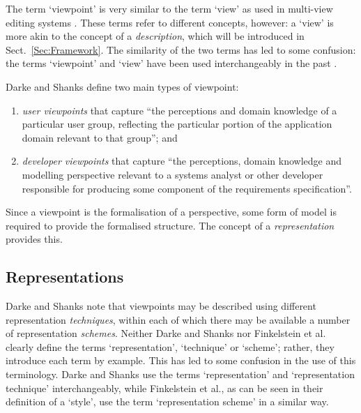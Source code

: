 \documentclass[10pt]{llncs}
\begin{document}
The term `viewpoint' is very similar to the term `view' as used in multi-view editing systems \cite{Grun:JC:1993:PhD,Jaco:DA:1995:MultiView,Meye:S:1991:IEEE}. These terms refer to different concepts, however: a `view' is more akin to the concept of a \emph{description}, which will be introduced in Sect.~\ref{Sec:Framework}. The similarity of the two terms has led to some confusion: the terms `viewpoint' and `view' have been used interchangeably in the past \cite{Jaco:DA:1995:MultiView}.

Darke and Shanks \cite{Dark:P:1995} define two main types of viewpoint:
\begin{enumerate}
	\item \emph{user viewpoints} that capture ``the perceptions and domain knowledge of a particular user group, reflecting the particular portion of the application domain relevant to that group''; and
	\item \emph{developer viewpoints} that capture ``the perceptions, domain knowledge and modelling perspective relevant to a systems analyst or other developer responsible for producing some component of the requirements specification''.
\end{enumerate}

Since a viewpoint is the formalisation of a perspective, some form of model is required to provide the formalised structure. The concept of a \emph{representation} provides this.


\subsection{Representations}
\label{Sec:Background:Viewpoints:Representations}

Darke and Shanks \cite{Dark:P:1995} note that viewpoints may be described using different representation \emph{techniques}, within each of which there may be available a number of representation \emph{schemes}. Neither Darke and Shanks nor Finkelstein et al. \cite{Fink:ACW:1989} clearly define the terms `representation', `technique' or `scheme'; rather, they introduce each term by example. This has led to some confusion in the use of this terminology. Darke and Shanks use the terms `representation' and `representation technique' interchangeably, while Finkelstein et al., as can be seen in their definition of a `style', use the term `representation scheme' in a similar way.
\end{document}
